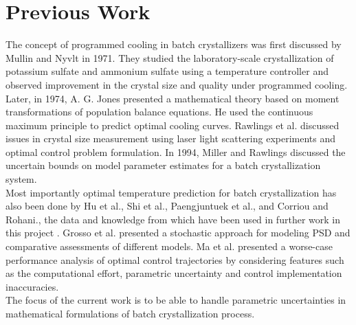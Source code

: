 \section{Previous Work}

The concept of programmed cooling in batch crystallizers was first discussed by Mullin and Nyvlt \cite{mullin} in 1971. They studied the laboratory-scale crystallization of potassium sulfate and ammonium sulfate using a temperature controller and observed improvement in the crystal size and quality under programmed cooling. \\
Later, in 1974, A. G. Jones \cite{agjones} presented a mathematical theory based on moment transformations of population balance equations. He used the continuous maximum principle to predict optimal cooling curves.
Rawlings et al. \cite{rawlings} discussed issues in crystal size measurement using laser light scattering experiments and optimal control problem formulation. In 1994, Miller and Rawlings \cite{miller_rawlings}  discussed the uncertain bounds on model parameter estimates for a batch crystallization system.\\ 
Most importantly optimal temperature prediction for batch crystallization has also been done by Hu et al.\cite{hu}, Shi et al.\cite{shi}, Paengjuntuek et al.\cite{paeng}, and Corriou and Rohani.\cite{corriou}, the data and knowledge from which have been used in further work in this project . Grosso et al.\cite{grosso} presented a stochastic approach for modeling PSD and comparative assessments of different models. Ma et al.\cite{ma} presented a worse-case performance analysis of optimal control trajectories by considering features such as the computational effort, parametric uncertainty and control implementation inaccuracies. \\
The focus of the current work is to be able to handle parametric uncertainties in mathematical formulations of batch crystallization process.
